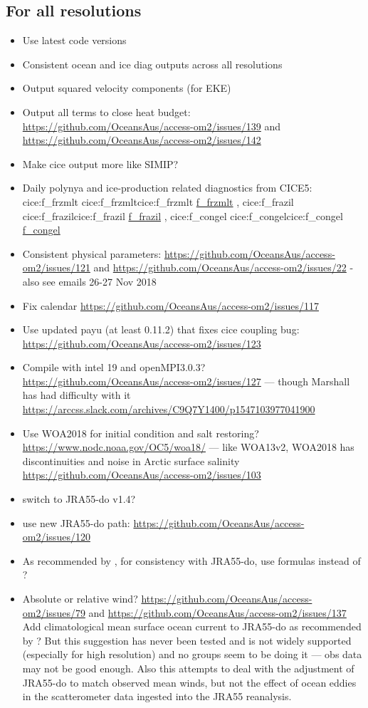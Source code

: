 \documentclass[11pt]{article}
\makeatletter
\newcommand*{\make@hex@label}[1]{%
  \def\hex@label{#1}%
  \@onelevel@sanitize\hex@label
  \EdefEscapeHex\hex@label{\hex@label}%
}
\newcommand*{\hexhyperlink}[2]{%
  \make@hex@label{#1}%
  \hyperlink{\hex@label}{#2}%
}
\newcommand{\cicelink}[2]{\hexhyperlink{cice:#2}{#1}}
\newcommand{\paramsty}[1]{\textsf{#1}}
\newcommand{\cice}[1]{\paramsty{\cicelink{#1}{#1}}\index{\paramsty{#1}}}
\makeatother
\begin{document}
\subsection{For all resolutions}
\begin{itemize}
\item Use latest code versions
\item Consistent ocean and ice diag outputs across all resolutions
\item Output squared velocity components (for EKE)
\item Output all terms to close heat budget: \url{https://github.com/OceansAus/access-om2/issues/139} and \url{https://github.com/OceansAus/access-om2/issues/142}
\item Make cice output more like SIMIP? \citep{NotzJahnHollandHunkeMassonnetStroeveTremblayVancoppenolle2016a}
\item Daily polynya and ice-production related diagnostics from CICE5: \cice{f_frzmlt}, \cice{f_frazil}, \cice{f_congel}
\item Consistent physical parameters: \url{https://github.com/OceansAus/access-om2/issues/121} and \url{https://github.com/OceansAus/access-om2/issues/22} - also see emails 26-27 Nov 2018
\item Fix calendar \url{https://github.com/OceansAus/access-om2/issues/117}
\item Use updated payu (at least 0.11.2) that fixes cice coupling bug: \url{https://github.com/OceansAus/access-om2/issues/123}
\item Compile with intel 19 and openMPI3.0.3? \url{https://github.com/OceansAus/access-om2/issues/127} --- though Marshall has had difficulty with it \url{https://arccss.slack.com/archives/C9Q7Y1400/p1547103977041900} 
\item Use WOA2018 for initial condition and salt restoring? \url{https://www.nodc.noaa.gov/OC5/woa18/} --- like WOA13v2, WOA2018 has discontinuities and noise in Arctic surface salinity \url{https://github.com/OceansAus/access-om2/issues/103}
\item switch to JRA55-do v1.4?
\item use new JRA55-do path: \url{https://github.com/OceansAus/access-om2/issues/120}
\item As recommended by \citet{TsujinoETAL2018a}, for consistency with JRA55-do, use \citet{Gill82a} formulas instead of \citet{LargeYeager2004a,LargeYeager2009a}?
\item Absolute or relative wind? \url{https://github.com/OceansAus/access-om2/issues/79} and \url{https://github.com/OceansAus/access-om2/issues/137} Add \citet{RioMuletPicot2014a} climatological mean surface ocean current to JRA55-do as recommended by \citet{TsujinoETAL2018a}? But this suggestion has never been tested and is not widely supported (especially for high resolution) and no groups seem to be doing it --- obs data may not be good enough. Also this attempts to deal with the adjustment of JRA55-do to match observed mean winds, but not the effect of ocean eddies in the scatterometer data ingested into the JRA55 reanalysis.

\end{itemize}
\end{document}
